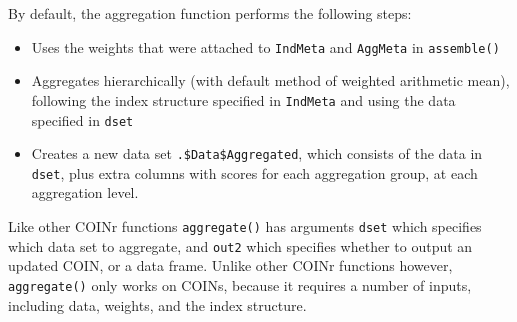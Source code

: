 \documentclass[
]{book}
\newenvironment{Shaded}{\begin{snugshade}}{\end{snugshade}}
\newcommand{\CommentTok}[1]{\textcolor[rgb]{0.56,0.35,0.01}{\textit{#1}}}
\newcommand{\DecValTok}[1]{\textcolor[rgb]{0.00,0.00,0.81}{#1}}
\newcommand{\DocumentationTok}[1]{\textcolor[rgb]{0.56,0.35,0.01}{\textbf{\textit{#1}}}}
\newcommand{\FunctionTok}[1]{\textcolor[rgb]{0.00,0.00,0.00}{#1}}
\newcommand{\NormalTok}[1]{#1}
\newcommand{\SpecialCharTok}[1]{\textcolor[rgb]{0.00,0.00,0.00}{#1}}
\providecommand{\tightlist}{%
  \setlength{\itemsep}{0pt}\setlength{\parskip}{0pt}}
\begin{document}
\begin{Shaded}
\end{Shaded}

By default, the aggregation function performs the following steps:

\begin{itemize}
\tightlist
\item
  Uses the weights that were attached to \texttt{IndMeta} and \texttt{AggMeta} in \texttt{assemble()}
\item
  Aggregates hierarchically (with default method of weighted arithmetic mean), following the index structure specified in \texttt{IndMeta} and using the data specified in \texttt{dset}
\item
  Creates a new data set \texttt{.\$Data\$Aggregated}, which consists of the data in \texttt{dset}, plus extra columns with scores for each aggregation group, at each aggregation level.
\end{itemize}

Like other COINr functions \texttt{aggregate()} has arguments \texttt{dset} which specifies which data set to aggregate, and \texttt{out2} which specifies whether to output an updated COIN, or a data frame. Unlike other COINr functions however, \texttt{aggregate()} only works on COINs, because it requires a number of inputs, including data, weights, and the index structure.
\end{document}
